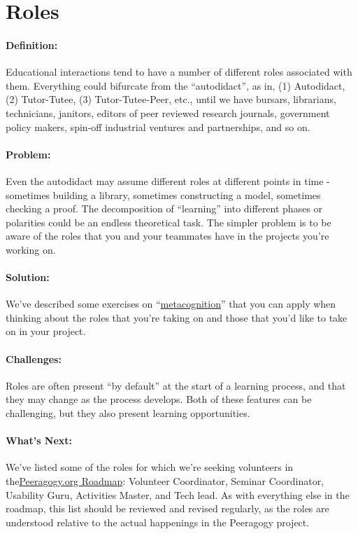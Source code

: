 \section{Roles}
\paragraph{Definition:} Educational interactions tend to have a number of
different roles associated with them. Everything could bifurcate from
the ``autodidact'', as in, (1) Autodidact, (2) Tutor-Tutee, (3)
Tutor-Tutee-Peer, etc., until we have bursars, librarians, technicians,
janitors, editors of peer reviewed research journals, government policy
makers, spin-off industrial ventures and partnerships, and so on.

\paragraph{Problem:} Even the autodidact may assume different roles at
different points in time - sometimes building a library, sometimes
constructing a model, sometimes checking a proof. The decomposition of
``learning'' into different phases or polarities could be an endless
theoretical task. The simpler problem is to be aware of the roles that
you and your teammates have in the projects you're working on.

\paragraph{Solution:} We've described some exercises on
``\href{http://peeragogy.org/can-we-work-together/}{metacognition}''
that you can apply when thinking about the roles that you're taking on
and those that you'd like to take on in your project.

\paragraph{Challenges:} Roles are often present ``by default'' at the start
of a learning process, and that they may change as the process develops.
Both of these features can be challenging, but they also present
learning opportunities.

\paragraph{What's Next:} We've listed some of the roles for which we're
seeking volunteers in
the\href{http://peeragogy.org/peeragogy-org-roadmap/}{Peeragogy.org
Roadmap}: Volunteer Coordinator, Seminar Coordinator, Usability Guru,
Activities Master, and Tech lead. As with everything else in the
roadmap, this list should be reviewed and revised regularly, as the
roles are understood relative to the actual happenings in the Peeragogy
project.
